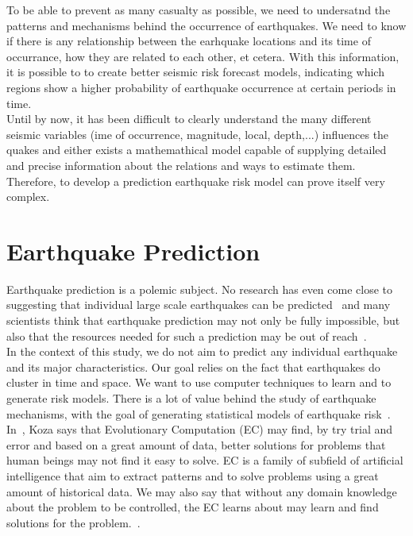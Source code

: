 To be able to prevent as many casualty as possible, we need to undersatnd the patterns and mechanisms behind the occurrence of earthquakes. We need to know if there is any relationship between the earhquake locations and its time of occurrance, how they are related to each other, et cetera. With this information, it is possible to to create better seismic risk forecast models, indicating which regions show a higher probability of earthquake occurrence at certain periods in time. \\

Until by now, it has been difficult to clearly understand the many different seismic variables (ime of occurrence, magnitude, local, depth,...) influences the quakes and either exists a mathemathical model capable of supplying detailed and precise information about the relations and ways to estimate them. Therefore, to develop a prediction earthquake risk model can prove itself very complex.\\

\section{Earthquake Prediction}

Earthquake prediction is a polemic subject. No research has even come close to suggesting that individual large scale earthquakes can be predicted~\cite{ecta14} and many scientists think that earthquake prediction may not only be fully impossible, but also that the resources needed for such a prediction may be out of reach~\cite{eberhard2014multiscale}.\\

In the context of this study, we do not aim to predict any individual earthquake and its major characteristics. Our goal relies on the fact that earthquakes do cluster in time and space. We want to use computer techniques to learn and to generate risk models. There is a lot of value behind the study of earthquake mechanisms, with the goal of generating statistical models of earthquake risk~\cite{Nature1999}.\\

In~\cite{Koza2003}, Koza says that Evolutionary Computation (EC) may find, by try trial and error and based on a great amount of data, better solutions for problems that human beings may not find it easy to solve. EC is a family of subfield of artificial intelligence that aim to extract patterns and to solve problems using a great amount of historical data. We may also say that without any domain knowledge about the problem to be controlled, the EC learns about may learn and find solutions for the problem.~\cite{Michie94machinelearning}.\\

